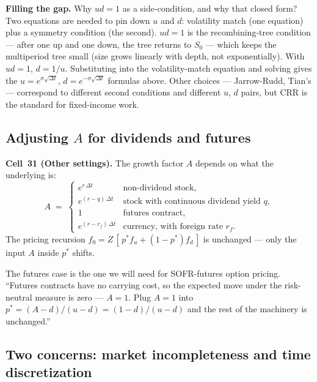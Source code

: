 \begin{tipblock}
\textbf{Filling the gap.} Why $ud = 1$ as a side-condition, and why
that closed form? Two equations are needed to pin down $u$ and $d$:
volatility match (one equation) plus a symmetry condition (the
second). $ud = 1$ is the recombining-tree condition --- after one
up and one down, the tree returns to $S_0$ --- which keeps the
multiperiod tree small (size grows linearly with depth, not
exponentially). With $ud = 1$, $d = 1/u$. Substituting into the
volatility-match equation and solving gives the
$u = e^{\sigma\sqrt{\Delta t}}$, $d = e^{-\sigma\sqrt{\Delta t}}$
formulas above. Other choices --- Jarrow-Rudd, Tian's --- correspond
to different second conditions and different $u$, $d$ pairs, but
CRR is the standard for fixed-income work.
\end{tipblock}

\subsection{Adjusting $A$ for dividends and futures}\label{L8-sec:adjustA}

\begin{keyblock}
\textbf{Cell~31 (Other settings).}
The growth factor $A$ depends on what the underlying is:
\[
  A \;=\;
    \begin{cases}
      e^{r\,\Delta t} & \text{non-dividend stock,} \\
      e^{(r - q)\,\Delta t} & \text{stock with continuous dividend yield } q, \\
      1               & \text{futures contract,} \\
      e^{(r - r_f)\,\Delta t} & \text{currency, with foreign rate } r_f.
    \end{cases}
\]
The pricing recursion $f_0 = Z\,[\,p^* f_u + (1-p^*) f_d\,]$ is
unchanged --- only the input $A$ inside $p^*$ shifts.
\end{keyblock}

The futures case is the one we will need for SOFR-futures option
pricing. ``Futures contracts have no carrying cost, so the expected
move under the risk-neutral measure is zero --- $A = 1$. Plug
$A = 1$ into $p^* = (A - d)/(u - d) = (1 - d)/(u - d)$ and the rest
of the machinery is unchanged.''

\subsection{Two concerns: market incompleteness and time discretization}\label{L8-sec:concerns}

